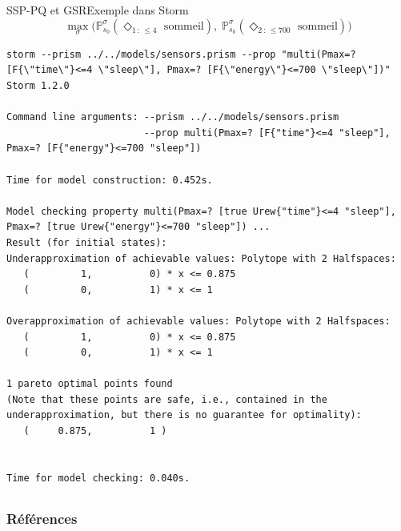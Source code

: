 \documentclass[compress]{beamer}
\theoremstyle{theorem}%
\begin{document}
\begin{frame}[fragile]{SSP-PQ et GSR}{Exemple dans Storm}
    \vspace{-0.05\linewidth}
    \[
    \max_\sigma \big(\mathbb{P}^{\sigma}_{s_0}(\Diamond_{1\, :\, \leq 4} \text{ sommeil}), \;
              \mathbb{P}^{\sigma}_{s_0}(\Diamond_{2\, :\, \leq 700} \text{ sommeil}) \big)
    \]
  {\fontsize{4}{5}
  \begin{verbatim}
storm --prism ../../models/sensors.prism --prop "multi(Pmax=? [F{\"time\"}<=4 \"sleep\"], Pmax=? [F{\"energy\"}<=700 \"sleep\"])"
Storm 1.2.0

Command line arguments: --prism ../../models/sensors.prism
                        --prop multi(Pmax=? [F{"time"}<=4 "sleep"], Pmax=? [F{"energy"}<=700 "sleep"])

Time for model construction: 0.452s.

Model checking property multi(Pmax=? [true Urew{"time"}<=4 "sleep"], Pmax=? [true Urew{"energy"}<=700 "sleep"]) ...
Result (for initial states):
Underapproximation of achievable values: Polytope with 2 Halfspaces:
   (         1,          0) * x <= 0.875
   (         0,          1) * x <= 1

Overapproximation of achievable values: Polytope with 2 Halfspaces:
   (         1,          0) * x <= 0.875
   (         0,          1) * x <= 1

1 pareto optimal points found
(Note that these points are safe, i.e., contained in the underapproximation, but there is no guarantee for optimality):
   (     0.875,          1 )


Time for model checking: 0.040s.
  \end{verbatim}
  }
\end{frame}



\subsection{}
\begin{frame}[allowframebreaks]
        \nocite{*}
        \frametitle{Références}
      \printbibliography
\end{frame}
\end{document}
